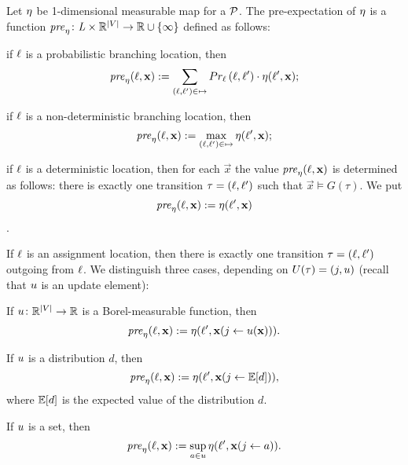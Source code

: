 \begin{definition}
	Let $\eta$ 
	be 1-dimensional measurable map for a \PP{} $\mathcal{P}$.
	The 
	pre-expectation of $\eta$ is a function $\mathit{pre}_{\eta}\colon \mathit{L}\times 
	\mathbb{R}^{|V|} \rightarrow \mathbb{R}\cup\{\infty\}$ defined as follows:
	\begin{compactitem} %
		\item 
		if $\ell$ is a probabilistic branching location, then
		$$\mathit{pre}_{\eta}(\ell,\mathbf{x}):=\sum_{(\ell,\ell')\in\mapsto} 
		Pr_{\ell}\left(\ell,\ell'\right)\cdot
		\eta(\ell',\mathbf{x});$$
		\item 
		if $\ell$ is a non-deterministic branching location, then
		$$\mathit{pre}_{\eta}(\ell,\mathbf{x}):=
		\max_{(\ell,\ell')\in\mapsto}\eta(\ell',\mathbf{x});$$
		
		\item 
		if $\ell$ is a deterministic location, then for each $\vec{x}$ the value 
		$\mathit{pre}_{\eta}(\ell,\mathbf{x})$ is determined as follows: there is exactly one 
		transition
		$\tau=(\ell,\ell')$ such that $\vec{x}\models G(\tau)$. We put $$\mathit{pre}_{\eta}(\ell,\mathbf{x}):= \eta(\ell',\mathbf{x})$$.
		\item 
		If $\ell$ is an assignment location, then there is exactly one transition $\tau=(\ell,\ell')$ outgoing from $\ell$.
		We distinguish 
		three cases, depending on $U(\tau)=(j,u)$ (recall that $u$ is an update element):
		\begin{compactitem}
			\item If $u\colon \mathbb{R}^{|V|}\rightarrow \mathbb{R}$ is a Borel-measurable function, then 
			$$\mathit{pre}_{\eta}(\ell,\mathbf{x}):= \eta(\ell',\mathbf{x}(j\leftarrow u(\mathbf{x}))).$$
			\item If $u$ is a distribution $d$, then $$ \mathit{pre}_{\eta}(\ell,\mathbf{x}):= 
			\eta(\ell',\mathbf{x}(j\leftarrow \mathbb{E}[d])),$$ where $\mathbb{E}[d]$ is the expected value of the 
			distribution $d$.
			\item 
			If $u$ is a set, then $$ \mathit{pre}_{\eta}(\ell,\mathbf{x}):= \sup_{a\in u}
			\eta(\ell',\mathbf{x}(j \leftarrow a)).$$
		\end{compactitem}
	\end{compactitem}
\end{definition}

